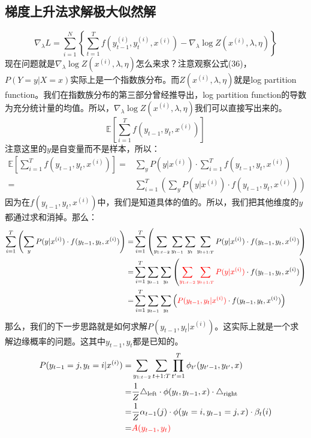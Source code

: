 \documentclass[a4paper]{article}
\begin{document}
\subsection{梯度上升法求解极大似然解}
\begin{equation}
    \nabla_\lambda L = \sum_{i=1}^N \left\{ \sum_{t=1}^Tf(y_{t-1}^{(i)},y_t^{(i)},x^{(i)}) - \nabla_\lambda  \log Z(x^{(i)},\lambda,\eta) \right\}
\end{equation}
现在问题就是$\nabla_\lambda  \log Z(x^{(i)},\lambda,\eta)$怎么来求？注意观察公式(36)，$P(Y=y|X=x)$实际上是一个指数族分布。而$Z(x^{(i)},\lambda,\eta)$就是log partition function。我们在指数族分布的第三部分曾经推导出，log partition function的导数为充分统计量的均值。所以，$\nabla_\lambda  \log Z(x^{(i)},\lambda,\eta)$我们可以直接写出来的。
$$
    \mathbb{E}\left[ \sum_{i=1}^T f(y_{t-1},y_t,x^{(i)}) \right]
$$
注意这里的$y$是自变量而不是样本，所以：
\begin{equation}
    \begin{split}
       \mathbb{E}\left[ \sum_{i=1}^T f(y_{t-1},y_t,x^{(i)}) \right] = & \sum_y P(y|x^{(i)}) \cdot  \sum_{i=1}^T f(y_{t-1},y_t,x^{(i)}) \\
       = & \sum_{i=1}^T \left( \sum_y P(y|x^{(i)}) \cdot f(y_{t-1},y_t,x^{(i)})  \right)
    \end{split}
\end{equation}
因为在$f(y_{t-1},y_t,x^{(i)})$中，我们是知道具体的值的。所以，我们把其他维度的$y$都通过求和消掉。那么：
\begin{equation}
    \begin{split}
        \sum_{i=1}^T \left( \sum_y P(y|x^{(i)}) \cdot f(y_{t-1},y_t,x^{(i)})  \right) 
        = & \sum_{i=1}^T \left( \sum_{y_{1:t-2}} \sum_{y_{t-1}} \sum_{y_t} \sum_{y_{t+1:T}} P(y|x^{(i)}) \cdot f(y_{t-1},y_t,x^{(i)})  \right) \\
        = & \sum_{i=1}^T \sum_{y_{t-1}} \sum_{y_t} \left( {\color{red}\sum_{y_{1:t-2}} \sum_{y_{t+1:T}} P(y|x^{(i)})} \cdot f(y_{t-1},y_t,x^{(i)})  \right) \\
        = & \sum_{i=1}^T \sum_{y_{t-1}} \sum_{y_t} \left( {\color{red} P(y_{t-1},y_t|x^{(i)})} \cdot f(y_{t-1},y_t,x^{(i)})  \right)\\
    \end{split}
\end{equation}
那么，我们的下一步思路就是如何求解$ P(y_{t-1},y_t|x^{(i)}) $。这实际上就是一个求解边缘概率的问题。这其中$y_{t-1},y_t$都是已知的。
\begin{equation}
    \begin{split}
        P(y_{t-1}=j,y_t=i|x^{(i)}) = & \sum_{y_{1:t-2}} \sum_{t+1:T} \prod_{t'=1}^T \phi_{t'}(y_{t'-1},y_{t'},x) \\
        = & \frac{1}{Z} \triangle_{\mathrm{left}}\cdot \phi(y_t,y_{t-1},x) \cdot \triangle_{\mathrm{right}} \\
        = & \frac{1}{Z} \alpha_{t-1}(j) \cdot \phi(y_t=i,y_{t-1}=j,x) \cdot \beta_{t}(i) \\
        = & {\color{red} A(y_{t-1},y_t) }
    \end{split}
\end{equation}
\end{document}
